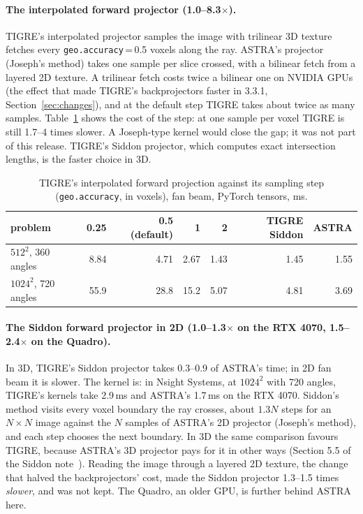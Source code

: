 \documentclass[11pt,a4paper]{article}
\begin{document}
\paragraph{The interpolated forward projector (1.0--8.3$\times$).}
TIGRE's interpolated projector samples the image with trilinear 3D texture fetches every
\texttt{geo.accuracy}\,=\,0.5 voxels along the ray. ASTRA's projector (Joseph's method) takes one sample per
slice crossed, with a bilinear fetch from a layered 2D texture. A trilinear fetch costs twice a bilinear one on
NVIDIA GPUs (the effect that made TIGRE's backprojectors faster in 3.3.1, Section~\ref{sec:changes}), and at the
default step TIGRE takes about twice as many samples. Table~\ref{tab:interp} shows the cost of the step: at
one sample per voxel TIGRE is still 1.7--4 times slower. A Joseph-type kernel would close the gap; it was not
part of this release. TIGRE's Siddon projector, which computes exact intersection lengths, is the faster
choice in 3D.
\begin{table}[H]
\centering\small
\caption{TIGRE's interpolated forward projection against its sampling step (\texttt{geo.accuracy}, in voxels),
fan beam, PyTorch tensors, ms.}
\label{tab:interp}
\begin{tabular}{lrrrrrr}
\toprule
problem & 0.25 & 0.5 (default) & 1 & 2 & TIGRE Siddon & ASTRA \\
\midrule
$512^2$, 360 angles & 8.84 & 4.71 & 2.67 & 1.43 & 1.45 & 1.55 \\
$1024^2$, 720 angles & 55.9 & 28.8 & 15.2 & 5.07 & 4.81 & 3.69 \\
\bottomrule
\end{tabular}
\end{table}

\paragraph{The Siddon forward projector in 2D (1.0--1.3$\times$ on the RTX 4070, 1.5--2.4$\times$ on the Quadro).}
In 3D, TIGRE's Siddon projector takes 0.3--0.9 of ASTRA's time; in 2D fan beam it is slower. The kernel is: in
Nsight Systems, at $1024^2$ with 720 angles, TIGRE's kernels take 2.9\,ms and ASTRA's 1.7\,ms on the RTX 4070.
Siddon's method visits every voxel boundary the ray crosses, about $1.3N$ steps for an $N\times N$ image against
the $N$ samples of ASTRA's 2D projector (Joseph's method), and each step chooses the next boundary. In 3D the
same comparison favours TIGRE, because ASTRA's 3D projector pays for it in other ways (Section 5.5 of the Siddon
note~\cite{tigre2025siddon}). Reading the image through a layered 2D texture, the change that halved the
backprojectors' cost, made the Siddon projector 1.3--1.5 times \emph{slower}, and was not kept. The Quadro, an
older GPU, is further behind ASTRA here.
\end{document}
